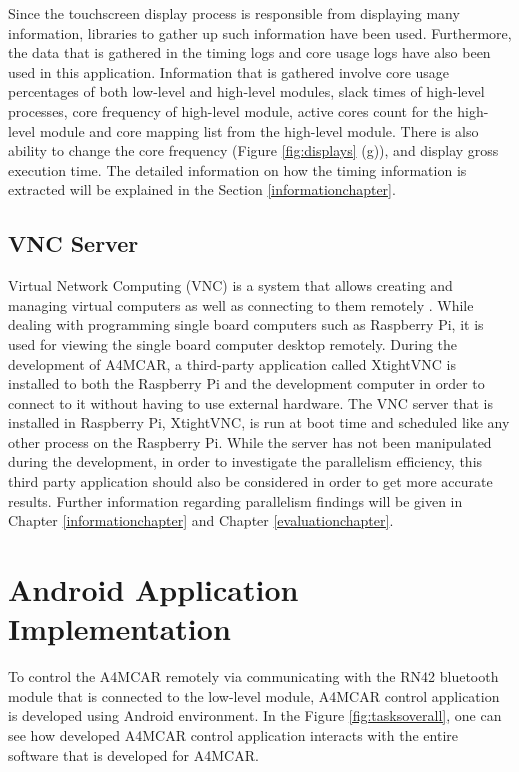 Since the touchscreen display process is responsible from displaying many information, libraries to gather up such information have been used. Furthermore, the data that is gathered in the timing logs and core usage logs have also been used in this application. Information that is gathered involve core usage percentages of both low-level and high-level modules, slack times of high-level processes, core frequency of high-level module, active cores count for the high-level module and core mapping list from the high-level module. There is also ability to change the core frequency (Figure \ref{fig:displays} (g)), and display gross execution time. The detailed information on how the timing information is extracted will be explained in the Section \ref{informationchapter}.

\subsection{VNC Server}
Virtual Network Computing (VNC) is a system that allows creating and managing virtual computers as well as connecting to them remotely \cite{vncmagazine}. While dealing with programming single board computers such as Raspberry Pi, it is used for viewing the single board computer desktop remotely. During the development of A4MCAR, a third-party application called XtightVNC is installed to both the Raspberry Pi and the development computer in order to connect to it without having to use external hardware.  The VNC server that is installed in Raspberry Pi, XtightVNC, is run at boot time and scheduled like any other process on the Raspberry Pi. While the server has not been manipulated during the development, in order to investigate the parallelism efficiency, this third party application should also be considered in order to get more accurate results. Further information regarding parallelism findings will be given in Chapter \ref{informationchapter} and Chapter \ref{evaluationchapter}. 

\section{Android Application Implementation}
To control the A4MCAR remotely via communicating with the RN42 bluetooth module that is connected to the low-level module, A4MCAR control application is developed using Android \cite{androidwebsite} environment. In the Figure \ref{fig:tasksoverall}, one can see how developed A4MCAR control application interacts with the entire software that is developed for A4MCAR. 

